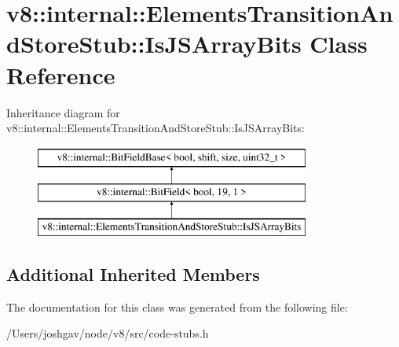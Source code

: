 \hypertarget{classv8_1_1internal_1_1_elements_transition_and_store_stub_1_1_is_j_s_array_bits}{}\section{v8\+:\+:internal\+:\+:Elements\+Transition\+And\+Store\+Stub\+:\+:Is\+J\+S\+Array\+Bits Class Reference}
\label{classv8_1_1internal_1_1_elements_transition_and_store_stub_1_1_is_j_s_array_bits}
Inheritance diagram for v8\+:\+:internal\+:\+:Elements\+Transition\+And\+Store\+Stub\+:\+:Is\+J\+S\+Array\+Bits\+:\begin{figure}[H]
\begin{center}
\leavevmode
\includegraphics[height=3.000000cm]{classv8_1_1internal_1_1_elements_transition_and_store_stub_1_1_is_j_s_array_bits}
\end{center}
\end{figure}
\subsection*{Additional Inherited Members}


The documentation for this class was generated from the following file\+:\begin{DoxyCompactItemize}
\item 
/\+Users/joshgav/node/v8/src/code-\/stubs.\+h\end{DoxyCompactItemize}
